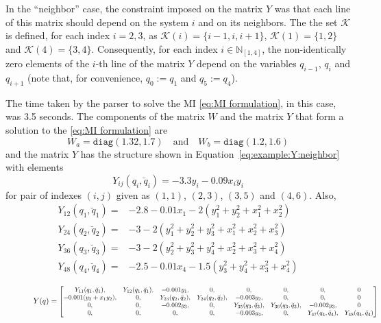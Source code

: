 \documentclass[10pt,twocolumn,twoside]{IEEEtran}
\theoremstyle{plain}
\theoremstyle{definition}
\theoremstyle{remark}
\begin{document}
In the ``neighbor'' case, the constraint imposed on the matrix $Y$ was that each line of this matrix should depend on the system $i$ and on its neighbors. The the set $\mathscr{K}$ is defined, for each index $i=2,3$, as $\mathscr{K}(i)=\{i-1,i,i+1\}$, $\mathscr{K}(1)=\{1,2\}$ and $\mathscr{K}(4)=\{3,4\}$. Consequently, for each index $i\in\mathbb{N}_{[1,4]}$, the non-identically zero elements of the $i$-th line of the matrix $Y$ depend on the variables $q_{i-1}$, $q_i$ and $q_{i+1}$ (note that, for convenience, $q_0:=q_1$ and $q_5:=q_4$).


The time taken by the parser to solve the MI \eqref{eq:MI formulation}, in this case, was 3.5 seconds. The components of the matrix $W$ and the matrix $Y$ that form a solution to the \eqref{eq:MI formulation} are
\begin{equation*}
		W_a=\mathbin{\mathtt{diag}}\left(
 1.32,1.7\right)\quad\text{and}\quad W_b=\mathbin{\mathtt{diag}}\left(1.2,1.6\right)
\end{equation*}
and the matrix $Y$ has the structure shown in Equation~\eqref{eq:example:Y:neighbor} with elements
\begin{equation*}
	Y_{ij}(q_i,\breve{q}_i)=-3.3y_i-0.09x_iy_i
\end{equation*}
for pair of indexes $(i,j)$ given as $(1,1)$, $(2,3)$, $(3,5)$ and $(4,6)$. Also, 
\begin{align*}
	Y_{12}(q_1,\breve{q}_1)=&-2.8-0.01x_1-2(y_1^2+y_2^2+x_1^2+x_2^2)\\	
	Y_{24}(q_2,\breve{q}_2)=&-3-2(y_1^2+y_2^2+y_3^2+x_1^2+x_2^2+x_3^2)\\	
	Y_{36}(q_3,\breve{q}_3)=&-3-2(y_2^2+y_3^2+y_4^2+x_2^2+x_3^2+x_4^2)\\	
	Y_{48}(q_4,\breve{q}_4)=&-2.5-0.01x_4-1.5(y_3^2+y_4^2+x_3^2+x_4^2)
\end{align*}

\begin{figure}
\begin{equation}\label{eq:example:Y:neighbor}
	Y(q)=\scalebox{0.85}{$\begin{bmatrix}
	Y_{11}(q_1,\breve{q}_1),&Y_{12}(q_1,\breve{q}_1),&-0.001y_1,&0,&0,&0,&0,&0\\
	-0.001(y_2+x_1y_2),&0,&Y_{23}(q_2,\breve{q}_2),&Y_{24}(q_2,\breve{q}_2),&-0.003y_2,&0,&0,&0\\
	0,&0,&-0.002y_3,&0,&Y_{35}(q_3,\breve{q}_3),&Y_{36}(q_3,\breve{q}_3),&-0.002y_3,&0\\
	0,&0,&0,&0,&-0.003y_4,&0,&Y_{47}(q_4,\breve{q}_4),&Y_{48}(q_4,\breve{q}_4)
	\end{bmatrix}$}
\end{equation}
\end{figure}
 
\end{document}
